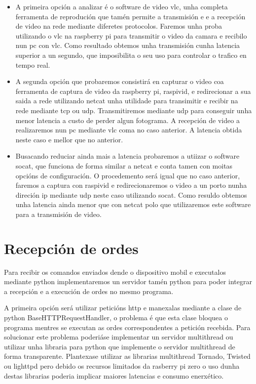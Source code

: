 \begin{itemize}
    \item A primeira opción a analizar é o software de video vlc, unha completa ferramenta de reprodución que tamén permite a transmisión e e a recepción de video na rede mediante diferetes protocolos. Faremos unha proba utilizando o vlc na raspberry pi para transmitir o video da camara e recibilo nun pc con vlc. Como resultado obtemos unha transmisión cunha latencia superior a un segundo, que imposibilita o seu uso para controlar o trafico en tempo real.

    \item A segunda opción que probaremos consistirá en capturar o video coa ferramenta de captura de video da raspberry pi, raspivid, e redirecionar a sua saida a rede utilizando netcat unha utilidade para transimitir e recibir na rede mediante tcp ou udp. Transmitiremos mediante udp para conseguir unha menor latencia a custo de perder algun fotograma. A recepción de video a realizaremos nun pc mediante vlc coma no caso anterior. A latencia obtida neste caso e mellor que no anterior.

    \item Busacando reduciar ainda mais a latencia probaremos a utiizar o software socat, que funciona de forma similar a netcat e conta tamen con moitas opcións de configuración. O procedemento será igual que no caso anterior, faremos a captura con raspivid e redirecionaremos o video a un porto nunha direción ip mediante udp neste caso utilizando socat. Como resuldo obtemos unha latencia ainda menor que con netcat polo que utilizaremos este software para a transmisión de video.
\end{itemize}

\section{Recepción de ordes}

 Para recibir os comandos enviados dende o dispositivo mobil e executalos mediante python implementaremos un servidor tamén python para poder integrar a recepción e a execución de ordes no mesmo programa.

 A primeira opción será utilizar peticións http e manexalas mediante a clase de python BaseHTTPRequestHandler, o problema é que esta clase bloquea o programa mentres se executan as ordes correspondentes a petición recebida. Para solucionar este problema poderiáse implementar un servidor multithread ou utilizar unha libraria para python que implemente o servidor multithread de forma transparente. Plantexase utilizar as librarias multithread Tornado, Twisted ou lighttpd pero debido os recursos limitados da rasberry pi zero o uso dunha destas librarias poderia implicar maiores latencias e consumo enerxético.


